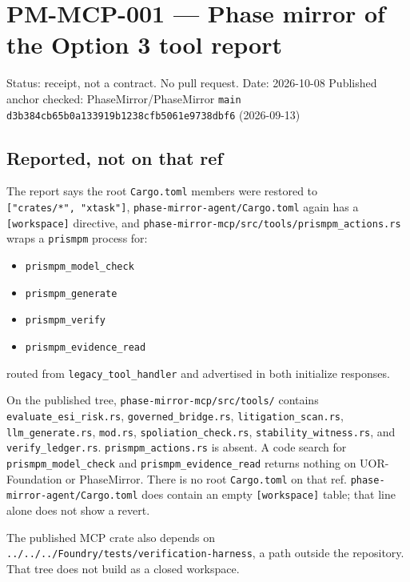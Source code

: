 \documentclass[
]{article}
\author{}
\date{}
\providecommand{\tightlist}{%
  \setlength{\itemsep}{0pt}\setlength{\parskip}{0pt}}
\begin{document}
\hypertarget{pm-mcp-001-phase-mirror-of-the-option-3-tool-report}{%
\section{PM-MCP-001 --- Phase mirror of the Option 3 tool
report}\label{pm-mcp-001-phase-mirror-of-the-option-3-tool-report}}

Status: receipt, not a contract. No pull request. Date: 2026-10-08
Published anchor checked: PhaseMirror/PhaseMirror \texttt{main}
\texttt{d3b384cb65b0a133919b1238cfb5061e9738dbf6} (2026-09-13)

\hypertarget{reported-not-on-that-ref}{%
\subsection{Reported, not on that ref}\label{reported-not-on-that-ref}}

The report says the root \texttt{Cargo.toml} members were restored to
\texttt{{[}"crates/*",\ "xtask"{]}},
\texttt{phase-mirror-agent/Cargo.toml} again has a
\texttt{{[}workspace{]}} directive, and
\texttt{phase-mirror-mcp/src/tools/prismpm\_actions.rs} wraps a
\texttt{prismpm} process for:

\begin{itemize}
\tightlist
\item
  \texttt{prismpm\_model\_check}
\item
  \texttt{prismpm\_generate}
\item
  \texttt{prismpm\_verify}
\item
  \texttt{prismpm\_evidence\_read}
\end{itemize}

routed from \texttt{legacy\_tool\_handler} and advertised in both
initialize responses.

On the published tree, \texttt{phase-mirror-mcp/src/tools/} contains
\texttt{evaluate\_esi\_risk.rs}, \texttt{governed\_bridge.rs},
\texttt{litigation\_scan.rs}, \texttt{llm\_generate.rs},
\texttt{mod.rs}, \texttt{spoliation\_check.rs},
\texttt{stability\_witness.rs}, and \texttt{verify\_ledger.rs}.
\texttt{prismpm\_actions.rs} is absent. A code search for
\texttt{prismpm\_model\_check} and \texttt{prismpm\_evidence\_read}
returns nothing on UOR-Foundation or PhaseMirror. There is no root
\texttt{Cargo.toml} on that ref. \texttt{phase-mirror-agent/Cargo.toml}
does contain an empty \texttt{{[}workspace{]}} table; that line alone
does not show a revert.

The published MCP crate also depends on
\texttt{../../../Foundry/tests/verification-harness}, a path outside the
repository. That tree does not build as a closed workspace.
\end{document}
